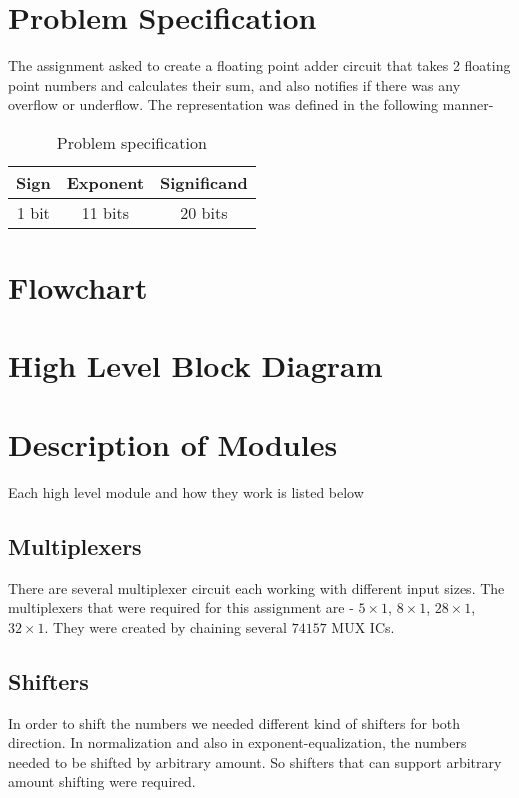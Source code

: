\documentclass[14pt]{article}
\begin{document}
\pagebreak

\section{Problem Specification}
The assignment asked to create a floating point adder circuit that takes 2 floating point numbers and calculates their sum, and also notifies if there was any overflow or underflow. The representation was defined in the following manner- \\

\begin{table}[!h]
	\begin{center}
		\begin{tabular}{|c|c|c|}
			\hline
			\textbf{Sign} & \textbf{Exponent} & \textbf{Significand}\\
			\hline
			1 bit & 11 bits & 20 bits\\
			\hline
		\end{tabular}
		\caption{Problem specification}
	\end{center}
\end{table}

\section{Flowchart}
\section{High Level Block Diagram}
\section{Description of Modules}
Each high level module and how they work is listed below

\subsection{Multiplexers}
There are several multiplexer circuit each working with different input sizes. The multiplexers that were required for this assignment are - $5\times1$, $8\times1$, $28\times1$, $32\times1$. They were created by chaining several $74157$ MUX ICs.

\subsection{Shifters}\label{shifter_section}
In order to shift the numbers we needed different kind of shifters for both direction. In normalization and also in exponent-equalization, the numbers needed to be shifted by arbitrary amount. So shifters that can support arbitrary amount shifting were required.\\
\end{document}
